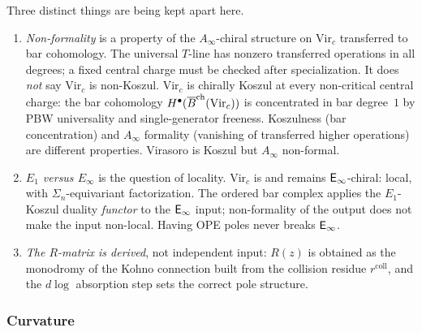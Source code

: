 \begin{remark}
\label{rem:non-formality-not-E1}
Three distinct things are being kept apart here.
\begin{enumerate}[label=(\roman*),nosep]
\item \emph{Non-formality} is a property
of the $A_\infty$-chiral structure on $\mathrm{Vir}_c$ transferred to
bar cohomology. The universal $T$-line has nonzero transferred
operations in all degrees; a fixed central charge must be checked after
specialization. It does \emph{not}
say $\mathrm{Vir}_c$ is non-Koszul. $\mathrm{Vir}_c$ is
chirally Koszul at every non-critical central charge: the bar
cohomology $H^\bullet(\overline{B}^{\mathrm{ch}}(\mathrm{Vir}_c))$ is concentrated
in bar degree~$1$ by PBW universality and single-generator
freeness. Koszulness (bar concentration) and $A_\infty$
formality (vanishing of transferred higher operations) are
different properties. Virasoro is Koszul but $A_\infty$
non-formal.
\item \emph{$E_1$ versus $E_\infty$} is the question of locality.
$\mathrm{Vir}_c$ is and remains $\mathsf{E}_{\infty}$-chiral: local, with
$\Sigma_n$-equivariant factorization. The ordered
bar complex applies the $E_1$-Koszul duality \emph{functor}
to the $\mathsf{E}_{\infty}$ input; non-formality of the output does not make
the input non-local. Having OPE poles never breaks $\mathsf{E}_{\infty}$.
\item \emph{The $R$-matrix is derived}, not independent input:
$R(z)$ is obtained as the monodromy of the Kohno connection
built from the collision residue $r^{\mathrm{coll}}$, and the
$d\log$ absorption step sets the correct pole
structure.
\end{enumerate}
\end{remark}

\subsubsection*{Curvature}

